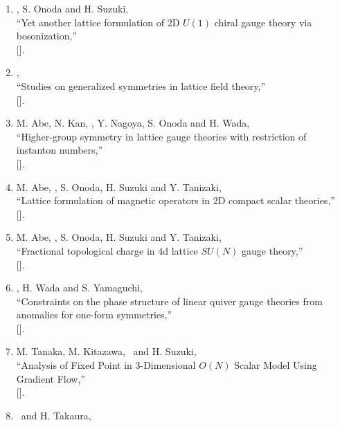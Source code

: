 \begin{enumerate}
       ``Non-perturbative formulation of quasi-stationary resonant state based on exact WKB method,''\\
       [].
 \item \OM, S. Onoda and H. Suzuki,\\
       ``Yet another lattice formulation of $2$D $U(1)$ chiral gauge theory via bosonization,''\\
       [].
 \item \OM,\\
       ``Studies on generalized symmetries in lattice field theory,''\\
       [].
 \item M. Abe, N. Kan, \OM, Y. Nagoya, S. Onoda and H. Wada,\\
       ``Higher-group symmetry in lattice gauge theories with restriction of instanton numbers,''\\
       [].
 \item M. Abe, \OM, S. Onoda, H. Suzuki and Y. Tanizaki,\\
       ``Lattice formulation of magnetic operators in $2$D compact scalar theories,''\\
       [].
 \item M. Abe, \OM, S. Onoda, H. Suzuki and Y. Tanizaki,\\
       ``Fractional topological charge in $4$d lattice $SU(N)$ gauge theory,''\\
       [].
 \item \OM, H. Wada and S. Yamaguchi,\\
       ``Constraints on the phase structure of linear quiver gauge theories from anomalies for one-form symmetries,''\\
       [].
 \item M. Tanaka, M. Kitazawa, \OM\ and H. Suzuki,\\
       ``Analysis of Fixed Point in $3$-Dimensional $O(N)$ Scalar Model Using Gradient Flow,''\\
       [].
 \item \OM\ and H. Takaura,\\

\end{enumerate}
